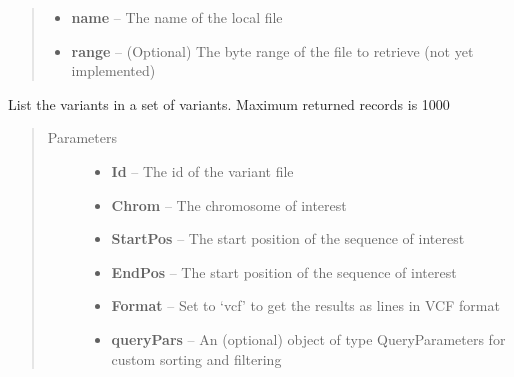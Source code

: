 \documentclass[letterpaper,10pt,english]{sphinxmanual}
\begin{document}
\begin{fulllineitems}
\begin{fulllineitems}
\begin{quote}
\begin{description}
\begin{itemize}
\item {} 
\textbf{name} -- The name of the local file

\item {} 
\textbf{range} -- (Optional) The byte range of the file to retrieve (not yet implemented)

\end{itemize}

\end{description}\end{quote}

\end{fulllineitems}


\begin{fulllineitems}
\label{Available modules:BaseSpacePy.api.BaseSpaceAPI.BaseSpaceAPI.filterVariantSet}
List the variants in a set of variants. Maximum returned records is 1000
\begin{quote}\begin{description}
\item[{Parameters}] \leavevmode\begin{itemize}
\item {} 
\textbf{Id} -- The id of the variant file

\item {} 
\textbf{Chrom} -- The chromosome of interest

\item {} 
\textbf{StartPos} -- The start position of the sequence of interest

\item {} 
\textbf{EndPos} -- The start position of the sequence of interest

\item {} 
\textbf{Format} -- Set to `vcf' to get the results as lines in VCF format

\item {} 
\textbf{queryPars} -- An (optional) object of type QueryParameters for custom sorting and filtering

\end{itemize}

\end{description}\end{quote}


\end{fulllineitems}
\end{fulllineitems}
\end{document}

